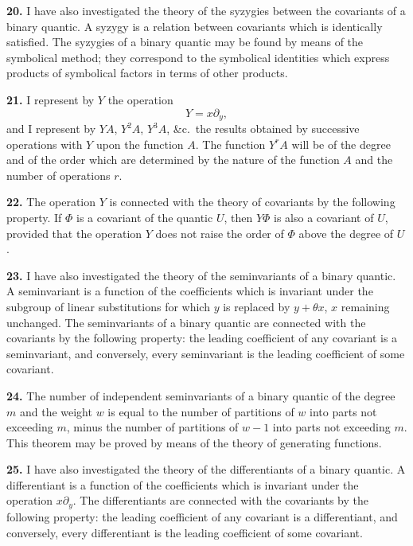 \documentclass[12pt,a4paper]{article}
\begin{document}
\textbf{20.} I have also investigated the theory of the syzygies between the covariants of a binary quantic. A syzygy is a relation between covariants which is identically satisfied. The syzygies of a binary quantic may be found by means of the symbolical method; they correspond to the symbolical identities which express products of symbolical factors in terms of other products.

\newpage
\setcounter{page}{255}

\textbf{21.} I represent by $Y$ the operation
\[
Y = x\partial_y,
\]
and I represent by $YA$, $Y^2A$, $Y^3A$, \&c.\ the results obtained by successive operations with $Y$ upon the function $A$. The function $Y^r A$ will be of the degree and of the order which are determined by the nature of the function $A$ and the number of operations $r$.

\textbf{22.} The operation $Y$ is connected with the theory of covariants by the following property. If $\Phi$ is a covariant of the quantic $U$, then $Y\Phi$ is also a covariant of $U$, provided that the operation $Y$ does not raise the order of $\Phi$ above the degree of $U$.

\textbf{23.} I have also investigated the theory of the seminvariants of a binary quantic. A seminvariant is a function of the coefficients which is invariant under the subgroup of linear substitutions for which $y$ is replaced by $y + \theta x$, $x$ remaining unchanged. The seminvariants of a binary quantic are connected with the covariants by the following property: the leading coefficient of any covariant is a seminvariant, and conversely, every seminvariant is the leading coefficient of some covariant.

\newpage
\setcounter{page}{256}

\textbf{24.} The number of independent seminvariants of a binary quantic of the degree $m$ and the weight $w$ is equal to the number of partitions of $w$ into parts not exceeding $m$, minus the number of partitions of $w-1$ into parts not exceeding $m$. This theorem may be proved by means of the theory of generating functions.

\textbf{25.} I have also investigated the theory of the differentiants of a binary quantic. A differentiant is a function of the coefficients which is invariant under the operation $x\partial_y$. The differentiants are connected with the covariants by the following property: the leading coefficient of any covariant is a differentiant, and conversely, every differentiant is the leading coefficient of some covariant.
\end{document}
